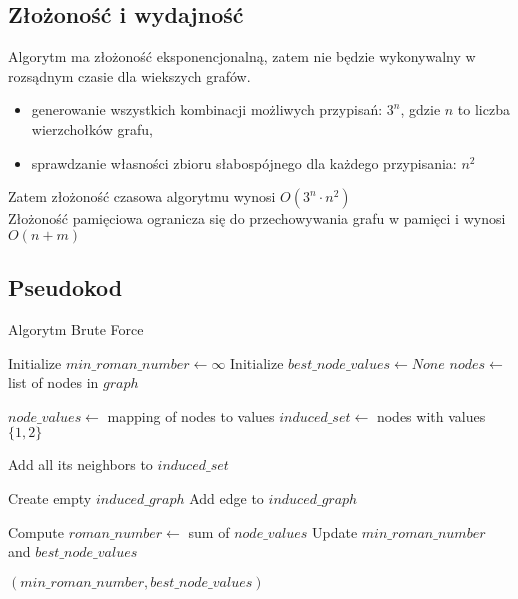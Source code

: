 \subsection{Złożoność i wydajność}

Algorytm ma złożoność eksponencjonalną, zatem nie będzie wykonywalny w rozsądnym czasie dla wiekszych grafów.
\begin{itemize}
    \item generowanie wszystkich kombinacji możliwych przypisań: $3^n$, gdzie $n$ to liczba wierzchołków grafu,
    \item sprawdzanie własności zbioru słabospójnego dla każdego przypisania: $n^2$
\end{itemize}

Zatem złożoność czasowa algorytmu wynosi $O(3^n \cdot n^2)$\\
Złożoność pamięciowa ogranicza się do przechowywania grafu w pamięci i wynosi $O(n + m)$

\subsection{Pseudokod}

\begin{algorithm}
    \caption*{Algorytm Brute Force}
    \begin{algorithmic}[1]
            \State Initialize $min\_roman\_number \gets \infty$
            \State Initialize $best\_node\_values \gets None$
            \State $nodes \gets$ list of nodes in $graph$
    
                \State $node\_values \gets$ mapping of nodes to values
                \State $induced\_set \gets$ nodes with values $\{1,2\}$
    
                    \State Add all its neighbors to $induced\_set$
                \EndFor
    
                \State Create empty $induced\_graph$
                                \State Add edge to $induced\_graph$
                            \EndIf
                        \EndFor
                    \EndIf
                \EndFor
    
                    \State Compute $roman\_number \gets$ sum of $node\_values$
                        \State Update $min\_roman\_number$ and $best\_node\_values$
                    \EndIf
                \EndIf
            \EndFor
    
            \State \Return $(min\_roman\_number, best\_node\_values)$
        \EndFunction
    \end{algorithmic}
\end{algorithm}

